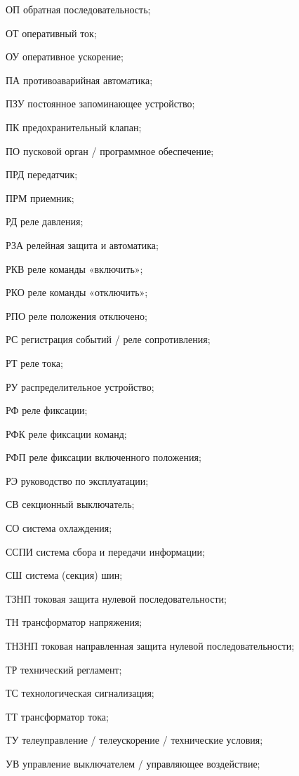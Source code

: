 \begin{list}{}
\item[ОП] обратная последовательность;
\item[ОТ] оперативный ток;
\item[ОУ] оперативное ускорение;
\item[ПА] противоаварийная автоматика;
\item[ПЗУ] постоянное запоминающее устройство;
\item[ПК] предохранительный клапан;
\item[ПО] пусковой орган / программное обеспечение;
\item[ПРД] передатчик;
\item[ПРМ] приемник;
\item[РД] реле давления;
\item[РЗА] релейная защита и автоматика;
\item[РКВ] реле команды «включить»;
\item[РКО] реле команды «отключить»;
\item[РПО] реле положения отключено;
\item[РС] регистрация событий / реле сопротивления;
\item[РТ] реле тока;
\item[РУ] распределительное устройство;
\item[РФ] реле фиксации;
\item[РФК] реле фиксации команд;
\item[РФП] реле фиксации включенного положения;
\item[РЭ] руководство по эксплуатации;
\item[СВ] секционный выключатель;
\item[СО] система охлаждения;
\item[ССПИ] система сбора и передачи информации;
\item[СШ] система (секция) шин;
\item[ТЗНП] токовая защита нулевой последовательности;
\item[ТН] трансформатор напряжения;
\item[ТНЗНП] токовая направленная защита нулевой последовательности;
\item[ТР] технический регламент;
\item[ТС] технологическая сигнализация;
\item[ТТ] трансформатор тока;
\item[ТУ] телеуправление / телеускорение / технические условия;
\item[УВ] управление выключателем / управляющее воздействие;

\end{list}
